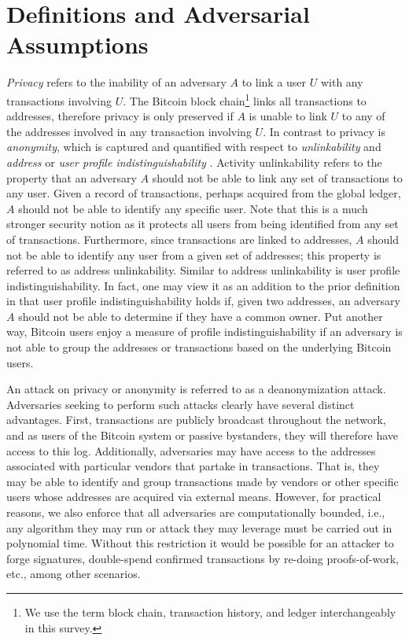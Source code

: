 \section{Definitions and Adversarial Assumptions} \label{sec:adversaries}
\emph{Privacy} refers to the inability of an adversary $A$ to link a user $U$ with any transactions involving $U$. The Bitcoin block chain\footnote{We use the term block chain, transaction history, and ledger interchangeably in this survey.} links all transactions to addresses, therefore privacy is only preserved if $A$ is unable to link $U$ to any of the addresses involved in any transaction involving $U$. In contrast to privacy is \emph{anonymity}, which is captured and quantified with respect to \emph{unlinkability} and \emph{address} or \emph{user profile indistinguishability} \cite{Androulaki12-privacy}. Activity unlinkability refers to the property that an adversary $A$ should not be able to link any set of transactions to any user. Given a record of transactions, perhaps acquired from the global ledger, $A$ should not be able to identify any specific user. Note that this is a much stronger security notion as it protects all users from being identified from any set of transactions. Furthermore, since transactions are linked to addresses, $A$ should not be able to identify any user from a given set of addresses; this property is referred to as address unlinkability. Similar to address unlinkability is user profile indistinguishability. In fact, one may view it as an addition to the prior definition in that user profile indistinguishability holds if, given two addresses, an adversary $A$ should not be able to determine if they have a common owner. Put another way, Bitcoin users enjoy a measure of profile indistinguishability if an adversary is not able to group the addresses or transactions based on the underlying Bitcoin users. 

An attack on privacy or anonymity is referred to as a deanonymization attack. Adversaries seeking to perform such attacks clearly have several distinct advantages. First, transactions are publicly broadcast throughout the network, and as users of the Bitcoin system or passive bystanders, they will therefore have access to this log. Additionally, adversaries may have access to the addresses associated with particular vendors that partake in transactions. That is, they may be able to identify and group transactions made by vendors or other specific users whose addresses are acquired via external means. However, for practical reasons, we also enforce that all adversaries are computationally bounded, i.e., any algorithm they may run or attack they may leverage must be carried out in polynomial time. Without this restriction it would be possible for an attacker to forge signatures, double-spend confirmed transactions by re-doing proofs-of-work, etc., among other scenarios. 

